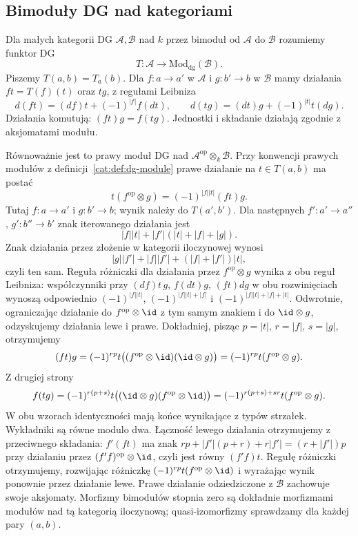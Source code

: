 \subsection{Bimoduły DG nad kategoriami}

\begin{definicja}[Bimoduł DG]\label{cat:def:morita-dg-bimodule}
Dla małych kategorii DG $\mathcal A,\mathcal B$ nad $k$ przez bimoduł od $\mathcal A$ do $\mathcal B$ rozumiemy funktor DG
\[
 T:\mathcal A\longrightarrow\mathrm{Mod}_{\mathrm{dg}}(\mathcal B).
\]
Piszemy $T(a,b)=T_a(b)$. Dla $f:a\to a'$ w $\mathcal A$ i $g:b'\to b$ w $\mathcal B$ mamy działania $ft=T(f)(t)$ oraz $tg$, z regułami Leibniza
\[
 d(ft)=(df)t+(-1)^{|f|}f(dt),\qquad
 d(tg)=(dt)g+(-1)^{|t|}t(dg).
\]
Działania komutują: $(ft)g=f(tg)$. Jednostki i składanie działają zgodnie z aksjomatami modułu.
\end{definicja}

Równoważnie jest to prawy moduł DG nad $\mathcal A^{\mathrm{op}}\otimes_k\mathcal B$. Przy konwencji prawych modułów z definicji~\ref{cat:def:dg-module} prawe działanie na $t\in T(a,b)$ ma postać
\[
 t(f^{\mathrm{op}}\otimes g)=(-1)^{|f||t|}(ft)g.
\]
Tutaj $f:a\to a'$ i $g:b'\to b$; wynik należy do $T(a',b')$. Dla następnych $f':a'\to a''$, $g':b''\to b'$ znak iterowanego działania jest
\[
 |f||t|+|f'|(|t|+|f|+|g|).
\]
Znak działania przez złożenie w kategorii iloczynowej wynosi
\[
 |g||f'|+|f||f'|+(|f|+|f'|)|t|,
\]
czyli ten sam. Reguła różniczki dla działania przez $f^{\mathrm{op}}\otimes g$ wynika z obu reguł Leibniza: współczynniki przy $(df)t\,g$, $f(dt)g$, $(ft)dg$ w obu rozwinięciach wynoszą odpowiednio
$(-1)^{|f||t|}$, $(-1)^{|f||t|+|f|}$ i $(-1)^{|f||t|+|f|+|t|}$.
Odwrotnie, ograniczając działanie do $f^{\mathrm{op}}\otimes\id$ z tym samym znakiem i do $\id\otimes g$, odzyskujemy działania lewe i prawe. Dokładniej, pisząc $p=|t|$, $r=|f|$, $s=|g|$, otrzymujemy
\[
 (ft)g=(-1)^{rp}t\bigl((f^{\mathrm{op}}\otimes\id)(\id\otimes g)\bigr)
 =(-1)^{rp}t(f^{\mathrm{op}}\otimes g).
\]
Z drugiej strony
\[
 f(tg)=(-1)^{r(p+s)}t\bigl((\id\otimes g)(f^{\mathrm{op}}\otimes\id)\bigr)
 =(-1)^{r(p+s)+sr}t(f^{\mathrm{op}}\otimes g).
\]
W obu wzorach identyczności mają końce wynikające z typów strzałek. Wykładniki są równe modulo dwa. Łączność lewego działania otrzymujemy z przeciwnego składania: $f'(ft)$ ma znak $rp+|f'|(p+r)+r|f'|=(r+|f'|)p$ przy działaniu przez $(f'f)^{\mathrm{op}}\otimes\id$, czyli jest równy $(f'f)t$. Regułę różniczki otrzymujemy, rozwijając różniczkę $(-1)^{rp}t(f^{\mathrm{op}}\otimes\id)$ i wyrażając wynik ponownie przez działanie lewe. Prawe działanie odziedziczone z $\mathcal B$ zachowuje swoje aksjomaty. Morfizmy bimodułów stopnia zero są dokładnie morfizmami modułów nad tą kategorią iloczynową; quasi-izomorfizmy sprawdzamy dla każdej pary $(a,b)$.

